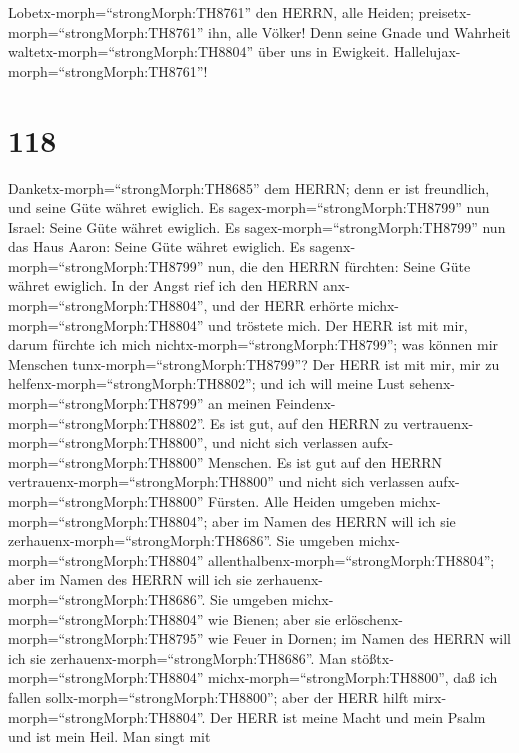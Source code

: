  Lobetx-morph=``strongMorph:TH8761'' den HERRN, alle Heiden;
preisetx-morph=``strongMorph:TH8761'' ihn, alle Völker! 
Denn seine Gnade und Wahrheit waltetx-morph=``strongMorph:TH8804'' über
uns in Ewigkeit. Hallelujax-morph=``strongMorph:TH8761''!

\hypertarget{section-117}{%
\section{118}\label{section-117}}

 Danketx-morph=``strongMorph:TH8685'' dem HERRN; denn er ist
freundlich, und seine Güte währet ewiglich.  Es
sagex-morph=``strongMorph:TH8799'' nun Israel: Seine Güte währet
ewiglich.  Es sagex-morph=``strongMorph:TH8799'' nun das
Haus Aaron: Seine Güte währet ewiglich.  Es
sagenx-morph=``strongMorph:TH8799'' nun, die den HERRN fürchten: Seine
Güte währet ewiglich.  In der Angst rief ich den HERRN
anx-morph=``strongMorph:TH8804'', und der HERR erhörte
michx-morph=``strongMorph:TH8804'' und tröstete mich.  Der
HERR ist mit mir, darum fürchte ich mich
nichtx-morph=``strongMorph:TH8799''; was können mir Menschen
tunx-morph=``strongMorph:TH8799''?  Der HERR ist mit mir,
mir zu helfenx-morph=``strongMorph:TH8802''; und ich will meine Lust
sehenx-morph=``strongMorph:TH8799'' an meinen
Feindenx-morph=``strongMorph:TH8802''.  Es ist gut, auf den
HERRN zu vertrauenx-morph=``strongMorph:TH8800'', und nicht sich
verlassen aufx-morph=``strongMorph:TH8800'' Menschen.  Es
ist gut auf den HERRN vertrauenx-morph=``strongMorph:TH8800'' und nicht
sich verlassen aufx-morph=``strongMorph:TH8800'' Fürsten. 
Alle Heiden umgeben michx-morph=``strongMorph:TH8804''; aber im Namen
des HERRN will ich sie zerhauenx-morph=``strongMorph:TH8686''.
 Sie umgeben michx-morph=``strongMorph:TH8804''
allenthalbenx-morph=``strongMorph:TH8804''; aber im Namen des HERRN will
ich sie zerhauenx-morph=``strongMorph:TH8686''.  Sie
umgeben michx-morph=``strongMorph:TH8804'' wie Bienen; aber sie
erlöschenx-morph=``strongMorph:TH8795'' wie Feuer in Dornen; im Namen
des HERRN will ich sie zerhauenx-morph=``strongMorph:TH8686''.
 Man stößtx-morph=``strongMorph:TH8804''
michx-morph=``strongMorph:TH8800'', daß ich fallen
sollx-morph=``strongMorph:TH8800''; aber der HERR hilft
mirx-morph=``strongMorph:TH8804''.  Der HERR ist meine
Macht und mein Psalm und ist mein Heil.  Man singt mit

